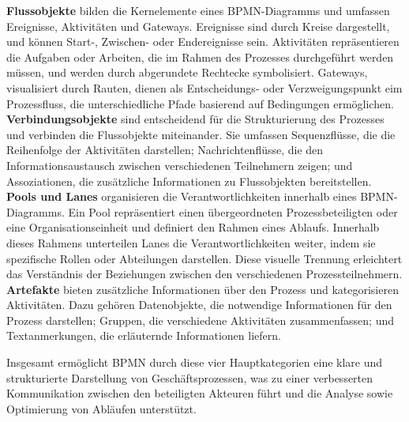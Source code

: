 \textbf{Flussobjekte} bilden die Kernelemente eines \ac{BPMN}-Diagramms und umfassen Ereignisse, Aktivitäten und Gateways. Ereignisse sind durch Kreise dargestellt, und können Start-, Zwischen- oder Endereignisse sein. 
Aktivitäten repräsentieren die Aufgaben oder Arbeiten, die im Rahmen des Prozesses durchgeführt werden müssen, und werden durch abgerundete Rechtecke symbolisiert.
Gateways, visualisiert durch Rauten, dienen als Entscheidungs- oder Verzweigungspunkt eim Prozessfluss, die unterschiedliche Pfade basierend auf Bedingungen ermöglichen. \\
\textbf{Verbindungsobjekte} sind entscheidend für die Strukturierung des Prozesses und verbinden die Flussobjekte miteinander. Sie umfassen Sequenzflüsse, die die Reihenfolge der Aktivitäten darstellen; Nachrichtenflüsse, die den Informationsaustausch zwischen verschiedenen Teilnehmern zeigen; und Assoziationen, die zusätzliche Informationen zu Flussobjekten bereitstellen.\\
\textbf{Pools und Lanes} organisieren die Verantwortlichkeiten innerhalb eines \ac{BPMN}-Diagramms. Ein Pool repräsentiert einen übergeordneten Prozessbeteiligten oder eine Organisationseinheit und definiert den Rahmen eines Ablaufs. Innerhalb dieses Rahmens unterteilen Lanes die Verantwortlichkeiten weiter, indem sie spezifische Rollen oder Abteilungen darstellen. Diese visuelle Trennung erleichtert das Verständnis der Beziehungen zwischen den verschiedenen Prozessteilnehmern.\\
\textbf{Artefakte} bieten zusätzliche Informationen über den Prozess und kategorisieren Aktivitäten. Dazu gehören Datenobjekte, die notwendige Informationen für den Prozess darstellen; Gruppen, die verschiedene Aktivitäten zusammenfassen; und Textanmerkungen, die erläuternde Informationen liefern.

Insgesamt ermöglicht \ac{BPMN} durch diese vier Hauptkategorien eine klare und strukturierte Darstellung von Geschäftsprozessen, was zu einer verbesserten Kommunikation zwischen den beteiligten Akteuren führt und die Analyse sowie Optimierung von Abläufen unterstützt.

\newpage
{}


